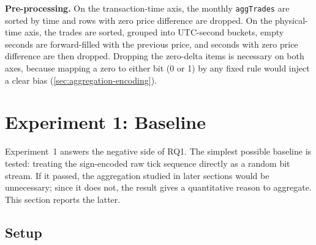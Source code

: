 \documentclass[11pt,titlepage,openany,oneside]{book}  %
\begin{document}
\textbf{Pre-processing.} On the transaction-time axis, the monthly \texttt{aggTrades} are sorted by time and rows with zero price difference are dropped. On the physical-time axis, the trades are sorted, grouped into UTC-second buckets, empty seconds are forward-filled with the previous price, and seconds with zero price difference are then dropped. Dropping the zero-delta items is necessary on both axes, because mapping a zero to either bit (0 or 1) by any fixed rule would inject a clear bias (\cref{sec:aggregation-encoding}).

\section{Experiment 1: Baseline}
\label{sec:exp1-baseline}

Experiment~1 answers the negative side of RQ1. The simplest possible baseline is tested: treating the sign-encoded raw tick sequence directly as a random bit stream. If it passed, the aggregation studied in later sections would be unnecessary; since it does not, the result gives a quantitative reason to aggregate. This section reports the latter.

\subsection{Setup}
\label{sec:exp1-setup}
\end{document}

